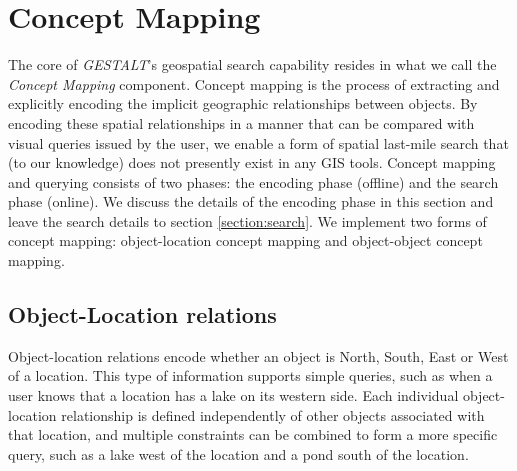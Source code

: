 \section{Concept Mapping}
\label{section:concept}

The core of \emph{GESTALT}'s geospatial search capability resides in what we call the \emph{Concept Mapping} component.
Concept mapping is the process of extracting and explicitly encoding the implicit geographic relationships between objects. 
By encoding these spatial relationships in a manner that can be compared with visual queries issued by the user, we enable a form of spatial last-mile search that (to our knowledge) does not presently exist in any GIS tools.
Concept mapping and querying consists of two phases: the encoding phase (offline) and the search phase (online). 
We discuss the details of the encoding phase in this section and leave the search details to section \ref{section:search}.
We implement two forms of concept mapping: object-location concept mapping and object-object concept mapping.

\subsection{Object-Location relations}
Object-location relations encode whether an object is North, South, East or West of a location. 
This type of information supports simple queries, such as when a user knows that a location has a lake on its western side. 
Each individual object-location relationship is defined independently of other objects associated with that location, and multiple constraints can be combined to form a more specific query, such as a lake west of the location and a pond south of the location.



